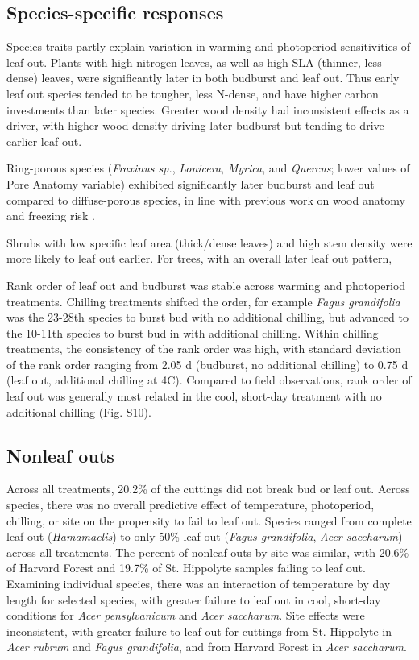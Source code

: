 \documentclass[11pt]{article}
\begin{document}
\subsection*{Species-specific responses}

Species traits partly explain variation in warming and photoperiod sensitivities of leaf out. Plants with high nitrogen leaves, as well as high SLA (thinner, less dense) leaves, were significantly later in both budburst and leaf out. Thus early leaf out species tended to be tougher, less N-dense, and have higher carbon investments than later species. Greater wood density had inconsistent effects as a driver, with higher wood density driving later budburst but tending to drive earlier leaf out.

Ring-porous species (\emph{Fraxinus sp.}, \emph{Lonicera}, \emph{Myrica}, and \emph{Quercus}; lower values of Pore Anatomy variable) exhibited significantly later budburst and leaf out compared to diffuse-porous species, in line with previous work on wood anatomy and freezing risk \cite{Sperry:1992}.

Shrubs with low specific leaf area (thick/dense leaves) and high stem density were more likely to leaf out earlier. For trees, with an overall later leaf out pattern, 

Rank order of leaf out and budburst was stable across warming and photoperiod treatments. Chilling treatments shifted the order, for example \emph{Fagus grandifolia} was the 23-28th species to burst bud with no additional chilling, but advanced to the 10-11th species to burst bud in with additional chilling. Within chilling treatments, the consistency of the rank order was high, with standard deviation of the rank order ranging from 2.05 d (budburst, no additional chilling) to 0.75 d (leaf out, additional chilling at 4\degree C). Compared to field observations, rank order of leaf out was generally most related in the cool, short-day treatment with no additional chilling (Fig. S10).

\subsection*{Nonleaf outs}

Across all treatments, 20.2\% of the cuttings did not break bud or leaf out. Across species, there was no overall predictive effect of temperature, photoperiod, chilling, or site on the propensity to fail to leaf out. Species ranged from complete leaf out (\emph{Hamamaelis}) to only 50\% leaf out (\emph{Fagus grandifolia}, \emph{Acer saccharum}) across all treatments. The percent of nonleaf outs by site was similar, with 20.6\% of Harvard Forest and 19.7\% of St. Hippolyte samples failing to leaf out. Examining individual species,  there was an interaction of temperature by day length for selected species, with greater failure to leaf out in cool, short-day conditions for \emph{Acer pensylvanicum}  and \emph{Acer saccharum}. Site effects were inconsistent, with greater failure to leaf out for cuttings from St. Hippolyte in \emph{Acer rubrum} and \emph{Fagus grandifolia}, and from Harvard Forest in \emph{Acer saccharum}. 
\end{document}
